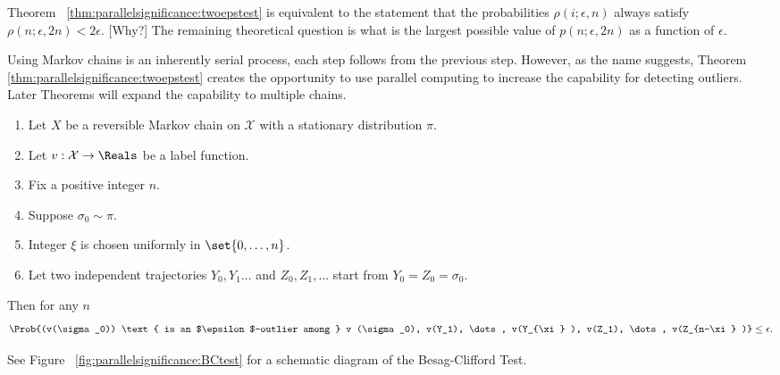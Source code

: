 \documentclass[12pt]{article}
\begin{document}
\begin{remark}
    Theorem~%
    \ref{thm:parallelsignificance:twoepstest} is equivalent to the
    statement that the probabilities \( \rho(i; \epsilon, n) \) always
    satisfy \( \rho(n; \epsilon, 2n) < 2\epsilon \).  [Why?] The
    remaining theoretical question is what is the largest possible value
    of \( p(n; \epsilon, 2n) \) as a function of \( \epsilon \).
\end{remark}

\begin{remark}
    Using Markov chains is an inherently serial process, each step
    follows from the previous step.  However, as the name suggests,
    Theorem~%
    \ref{thm:parallelsignificance:twoepstest} creates the opportunity to
    use parallel computing to increase the capability for detecting
    outliers.  Later Theorems will expand the capability to multiple
    chains.
\end{remark}

\begin{theorem}
    \label{thm:parallelsignificance:bc1}
    \begin{enumerate}
        \item
            Let \( X \) be a reversible Markov chain on \( \mathcal{X} \)
            with a stationary distribution \( \pi \).
        \item
            Let \( v :  \mathcal{X} \to \Reals \) be a label function.
        \item
            Fix a positive integer \( n \).
        \item
            Suppose \( \sigma_0 \sim \pi \).
        \item
            Integer \( \xi \) is chosen uniformly in \( \set{0,\dots, n}
            \).
        \item
            Let two independent trajectories \( Y_0 , Y_1 \dots \) and \(
            Z_0, Z_1, \dots \) start from \( Y_0 = Z_0 = \sigma_0 \).
    \end{enumerate}
    Then for any \( n \)
    \[
        \Prob{(v(\sigma_0)) \text{ is an $\epsilon$-outlier among } v
        (\sigma_0), v(Y_1), \dots, v(Y_{\xi} ), v(Z_1), \dots, v(Z_{n-\xi}
        )} \le \epsilon.
    \]
\end{theorem}

\begin{remark}
    See Figure~%
    \ref{fig:parallelsignificance:BCtest} for a schematic diagram of the
    Besag-Clifford Test.
\end{remark}
\end{document}
